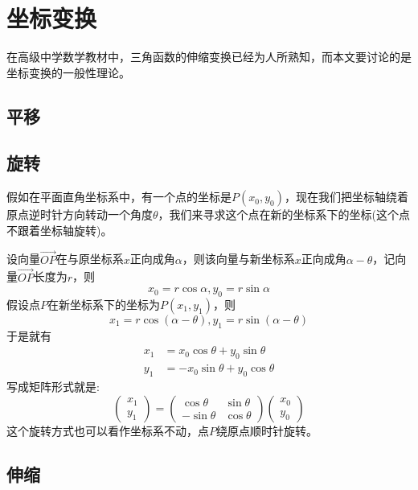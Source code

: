 
\section{坐标变换}
\label{sec:codinatie-axias-rotation}

在高级中学数学教材中，三角函数的伸缩变换已经为人所熟知，而本文要讨论的是坐标变换的一般性理论。

\subsection{平移}

\subsection{旋转}
假如在平面直角坐标系中，有一个点的坐标是$P(x_0,y_0)$，现在我们把坐标轴绕着原点逆时针方向转动一个角度$\theta$，我们来寻求这个点在新的坐标系下的坐标(这个点不跟着坐标轴旋转)。

设向量$\overrightarrow{OP}$在与原坐标系$x$正向成角$\alpha$，则该向量与新坐标系$x$正向成角$\alpha-\theta$，记向量$\overrightarrow{OP}$长度为$r$，则
\begin{equation*}
  x_0=r\cos{\alpha},y_0=r\sin{\alpha}
\end{equation*}
假设点$P$在新坐标系下的坐标为$P(x_1,y_1)$，则
\begin{equation*}
  x_1=r\cos{(\alpha-\theta)},y_1=r\sin{(\alpha-\theta)}
\end{equation*}
于是就有
\begin{equation}
  \label{eq:formulas-rotation-axias}
  \begin{split}
  x_1 & = x_0\cos{\theta} + y_0\sin{\theta} \\
  y_1 & = -x_0\sin{\theta} + y_0\cos{\theta}
  \end{split}
\end{equation}
写成矩阵形式就是:
\begin{equation*}
  \left(
    \begin{array}{c}
      x_1 \\
      y_1
    \end{array}
  \right)
    =
    \left(
      \begin{array}{cc}
        \cos{\theta} & \sin{\theta} \\
        -\sin{\theta} & \cos{\theta}
      \end{array}
    \right)
  \left(
    \begin{array}{c}
      x_0 \\
      y_0
    \end{array}
  \right)
\end{equation*}
这个旋转方式也可以看作坐标系不动，点$P$绕原点顺时针旋转。

\subsection{伸缩}


